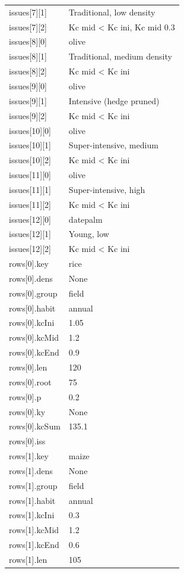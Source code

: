 {\begin{longtable}{p{}p{}}
{}issues[7][1] & Traditional, low density\\
{}issues[7][2] & Kc mid < Kc ini, Kc mid 0.3\\
{}issues[8][0] & olive\\
{}issues[8][1] & Traditional, medium density\\
{}issues[8][2] & Kc mid < Kc ini\\
{}issues[9][0] & olive\\
{}issues[9][1] & Intensive (hedge pruned)\\
{}issues[9][2] & Kc mid < Kc ini\\
{}issues[10][0] & olive\\
{}issues[10][1] & Super-intensive, medium\\
{}issues[10][2] & Kc mid < Kc ini\\
{}issues[11][0] & olive\\
{}issues[11][1] & Super-intensive, high\\
{}issues[11][2] & Kc mid < Kc ini\\
{}issues[12][0] & datepalm\\
{}issues[12][1] & Young, low\\
{}issues[12][2] & Kc mid < Kc ini\\
{}rows[0].key & rice\\
{}rows[0].dens & None\\
{}rows[0].group & field\\
{}rows[0].habit & annual\\
{}rows[0].kcIni & 1.05\\
{}rows[0].kcMid & 1.2\\
{}rows[0].kcEnd & 0.9\\
{}rows[0].len & 120\\
{}rows[0].root & 75\\
{}rows[0].p & 0.2\\
{}rows[0].ky & None\\
{}rows[0].kcSum & 135.1\\
{}rows[0].iss & \\
{}rows[1].key & maize\\
{}rows[1].dens & None\\
{}rows[1].group & field\\
{}rows[1].habit & annual\\
{}rows[1].kcIni & 0.3\\
{}rows[1].kcMid & 1.2\\
{}rows[1].kcEnd & 0.6\\
{}rows[1].len & 105\\

\end{longtable}}
